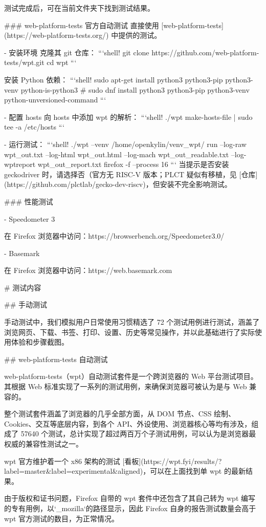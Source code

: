 \documentclass{article}
\begin{document}
\begin{markdown}
测试完成后，可在当前文件夹下找到测试结果。

### web-platform-tests 官方自动测试
直接使用 [web-platform-tests](https://web-platform-tests.org/) 中提供的测试。

- 安装环境
克隆其 git 仓库：
```shell!
git clone https://github.com/web-platform-tests/wpt.git
cd wpt
```

安装 Python 依赖：
```shell!
sudo apt-get install python3 python3-pip python3-venv python-is-python3
# sudo dnf install python3 python3-pip python3-venv python-unversioned-command
```

- 配置 hosts
向 hosts 中添加 wpt 的解析：
```shell!
./wpt make-hosts-file | sudo tee -a /etc/hosts
```

- 运行测试：
```shell!
./wpt --venv /home/openkylin/venv_wpt/ run --log-raw wpt_out.txt --log-html wpt_out.html --log-mach wpt_out_readable.txt --log-wptreport wpt_out_report.txt firefox -f --process 16
```
当提示是否安装 geckodriver 时，请选择否（官方无 RISC-V 版本；PLCT 疑似有移植，见 [仓库](https://github.com/plctlab/gecko-dev-riscv)，但安装不完全影响测试。

### 性能测试

- Speedometer 3

在 Firefox 浏览器中访问：https://browserbench.org/Speedometer3.0/

- Basemark

在 Firefox 浏览器中访问：https://web.basemark.com

# 测试内容

## 手动测试

手动测试中，我们模拟用户日常使用习惯精选了 72 个测试用例进行测试，涵盖了浏览网页、下载、书签、打印、设置、历史等常见操作，并以此基础进行了实际使用体验和步骤截图。

## web-platform-tests 自动测试

web-platform-tests（wpt）自动测试套件是一个跨浏览器的 Web 平台测试项目。其根据 Web 标准实现了一系列的测试用例，来确保浏览器可被认为是与 Web 兼容的。

整个测试套件涵盖了浏览器的几乎全部方面，从 DOM 节点、CSS 绘制、Cookies、交互等底层内容，到各个 API、外设使用、浏览器核心等均有涉及，组成了 57640 个测试，总计实现了超过两百万个子测试用例，可以认为是浏览器最权威的兼容性测试之一。

wpt 官方维护着一个 x86 架构的测试 [看板](https://wpt.fyi/results/?label=master&label=experimental&aligned)，可以在上面找到单 wpt 的最新结果。

由于版权和证书问题，Firefox 自带的 wpt 套件中还包含了其自己转为 wpt 编写的专有用例，以`_mozilla`的路径显示，因此 Firefox 自身的报告测试数量会高于 wpt 官方测试的数目，为正常情况。


\end{markdown}
\end{document}
